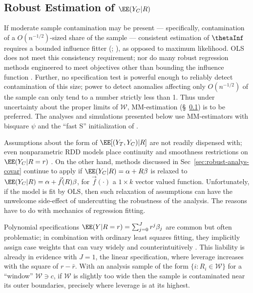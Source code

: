 \subsection{Robust Estimation of $\EE (Y_{C}| R)$}
\label{sec:robust-altern-ordin}
If moderate sample contamination may be present --- specifically, contamination of
a $O(n^{-1/2})$-sized
share of the sample --- consistent estimation of $\thetaInf$ requires a
bounded influence fitter (\citealp[Thm.~3]{he1991localbreakdown};
\citealp{yohaiZamar1997locallyrobustMestimates}), as opposed to
maximum likelihood.  OLS does not meet this consistency requirement;
nor do many robust regression methods engineered to meet
objectives other than bounding the influence function
\citep{stefanski1991note}.
Further, no specification test is powerful enough
to reliably detect contamination of this size; power to detect anomalies
affecting only $O(n^{-1/2})$ of the sample can only tend to a number
strictly less than 1.  %
Thus under uncertainty about the
proper limits of $\mathcal{W}$, MM-estimation (\S~\ref{sec:robust-altern-ordin}) is to be preferred.
The analyses and simulations presented below use MM-estimators with bisquare $\psi$ and
the ``fast S'' initialization of \citet{salibian-barreraYohai2006fastS}.

\sloppy
Assumptions about the form of $\EE[(Y_{T}, Y_{C}) | R]$ are not
readily dispensed with;
even nonparametric RDD models
place continuity and smoothness restrictions on $\EE(Y_{C}| R=r)$ \citep[\S~5]{lee2008regression, kolesarRothe17}.
On the other hand, methods discussed in Sec~\ref{sec:robust-analys-covar} continue to
apply if $\EE (Y_{C}| R) = \alpha + R\beta$ is relaxed to
$\EE (Y_{C}| R) = \alpha + \vec{f}(R)\beta$, for
$\vec{f}(\cdot)$ a $1 \times k$ vector valued function.
Unfortunately, if the model is fit by OLS, then such relaxation of assumptions can have the unwelcome
side-effect of undercutting the robustness of the analysis.  The
reasons have to do with mechanics of regression fitting.

Polynomial specifications
$\EE(Y | R=r) = \sum_{j=0}^{J} r^{j} \beta_{j}$ are common but often
problematic; in combination with ordinary least squares fitting, they
implicitly assign case weights that can vary widely and
counterintuitively \citep{gelman2016high}.
This liability is already
in evidence with $J=1$, the linear specification, where leverage
increases with the square of $r -\bar{r}$.  With an analysis sample
of the form $\{i : R_{i} \in \mathcal{W}\}$ for a ``window''
$\mathcal{W} \ni c$, if $\mathcal{W}$ is slightly too wide then the
sample is contaminated near its outer boundaries, precisely
where leverage is at its highest.

